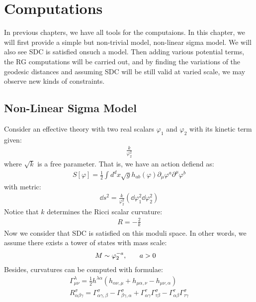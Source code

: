 \chapter{Computations}
\label{computations}
In previous chapters, we have all tools for the computaions. In this chapter, we will first provide a simple but non-trivial model, non-linear sigma model. We will also see SDC is satisfied onsuch a model. Then adding various potential terms, the RG computations will be carried out, and by finding the variations of the geodesic distances and assuming SDC will be still valid at varied scale, we may observe new kinds of constraints. 


\section{Non-Linear Sigma Model}
Consider an effective theory with two real scalars $\varphi_{1}$ and $\varphi_{2}$ with its kinetic term given:
\begin{align}
    \frac{k}{\varphi_{2}^{2}} 
\end{align}
where $\sqrt{k}$ is a free parameter. That is, we have an action defiend as:
\begin{align}
    S[\varphi] = \frac{1}{2}\int d^{d}x \sqrt{g} h_{ab}(\varphi) \partial _{\mu} \varphi^{a} \partial ^{\mu} \varphi^{b}
\end{align}
with metric:
\begin{align}
    \dd s^{2} = \frac{k}{\varphi_{2}^{2}} (\dd \varphi_{1}^{2} \dd \varphi_{2}^{2} )
\end{align}
Notice that $k$ determines the Ricci scalar curvature:
\begin{align}
    R = -\frac{2}{k}
\end{align}
Now we consider that SDC is satisfied on this moduli space. In other words, we assume there exists a tower of states with mass scale:
\begin{align}
    M \sim \varphi_{2}^{-a} ,& \qq{} a>0
\end{align}
Besides, curvatures can be computed with formulae:
\begin{align}
    \Gamma _{\mu \nu}^{\lambda} = \frac{1}{2} h^{\lambda \alpha} (h_{\alpha \nu , \mu} + h_{\mu \alpha, \nu} - h_{\mu \nu ,\alpha}) \\
    R_{\alpha \beta \gamma} ^{\sigma} = \Gamma _{\alpha \gamma, \beta} ^{\sigma} - \Gamma _{\beta \gamma , \alpha} ^{\sigma} + \Gamma _{\alpha \gamma} ^{\tau} \Gamma _{\tau \beta} ^{\sigma} - \Gamma_{\alpha \beta}^{\tau} \Gamma_{\tau \gamma} ^{\sigma}
\end{align}
